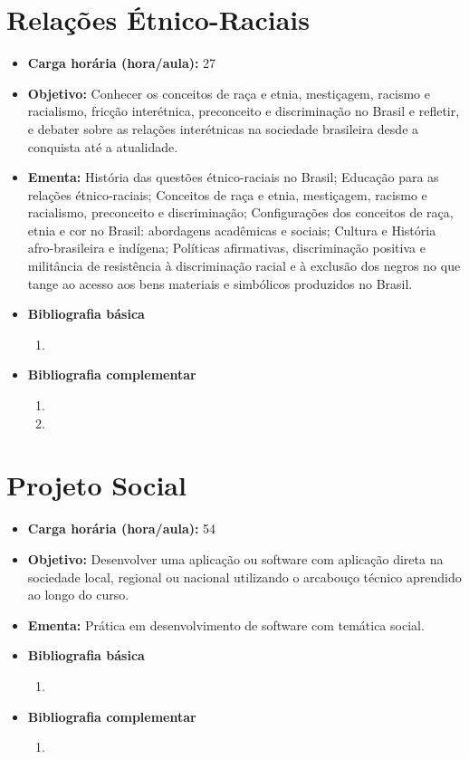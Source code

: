 \documentclass[11pt,fleqn]{book} %
\begin{document}
\section{Relações Étnico-Raciais}\label{4_etnicoraciais}
\begin{itemize}
	\item \textbf{Carga horária (hora/aula):} 27
	\item \textbf{Objetivo:} Conhecer os conceitos de raça e etnia, mestiçagem, racismo e racialismo, fricção interétnica, preconceito e discriminação no Brasil e refletir, e debater sobre as relações interétnicas na sociedade brasileira desde a conquista até a atualidade.
	\item \textbf{Ementa:} 
	História das questões étnico-raciais no Brasil;
	Educação para as relações étnico-raciais;
	Conceitos de raça e etnia, mestiçagem, racismo e racialismo, preconceito e discriminação;
	Configurações dos conceitos de raça, etnia e cor no Brasil: abordagens acadêmicas e sociais;
	Cultura e História afro-brasileira e indígena;
	Políticas afirmativas, discriminação positiva e militância de resistência à discriminação racial e à exclusão dos negros no que tange ao acesso aos bens materiais e simbólicos produzidos no Brasil.
	\item \textbf{Bibliografia básica}
	\begin{enumerate}
		\item 
	\end{enumerate}
	\item \textbf{Bibliografia complementar}
	\begin{enumerate}
		\item
		\item 
	\end{enumerate}
\end{itemize}

\newpage
\section{Projeto Social}\label{4_projsoc}
\begin{itemize}
	\item \textbf{Carga horária (hora/aula):} 54
	\item \textbf{Objetivo:} Desenvolver uma aplicação ou software com aplicação direta na sociedade local, regional ou nacional utilizando o arcabouço técnico aprendido ao longo do curso.
	\item \textbf{Ementa:} 
	Prática em desenvolvimento de software com temática social.
	\item \textbf{Bibliografia básica}
	\begin{enumerate}
		\item 
	\end{enumerate}
	\item \textbf{Bibliografia complementar}
	\begin{enumerate}
		\item 	
	\end{enumerate}	
\end{itemize}
\end{document}
